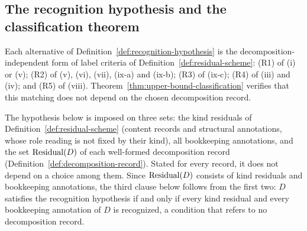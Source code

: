 \subsection{The recognition hypothesis and the classification theorem}\label{subsec:classification-theorem}

Each alternative of Definition~\ref{def:recognition-hypothesis} is the
decomposition-independent form of label criteria of
Definition~\ref{def:residual-scheme}: (R1) of (i) or (v); (R2) of (v), (vi),
(vii), (ix-a) and (ix-b); (R3) of (ix-c); (R4) of (iii) and (iv); and (R5) of
(viii). Theorem~\ref{thm:upper-bound-classification} verifies that this
matching does not depend on the chosen decomposition record.

The hypothesis below is imposed on three sets: the kind residuals of Definition~\ref{def:residual-scheme} (content records and structural annotations, whose role reading is not fixed by their kind), all bookkeeping annotations, and the set \(\operatorname{Residual}\!\left(D\right)\) of each well-formed decomposition record (Definition~\ref{def:decomposition-record}). Stated for every record, it
does not depend on a choice among them. Since \(\operatorname{Residual}\!\left(D\right)\) consists of kind
residuals and bookkeeping annotations, the third clause below follows from the first two: \(D\) satisfies the recognition
hypothesis if and only if every kind residual and every bookkeeping annotation of
\(D\) is recognized, a condition that refers to no decomposition
record.

